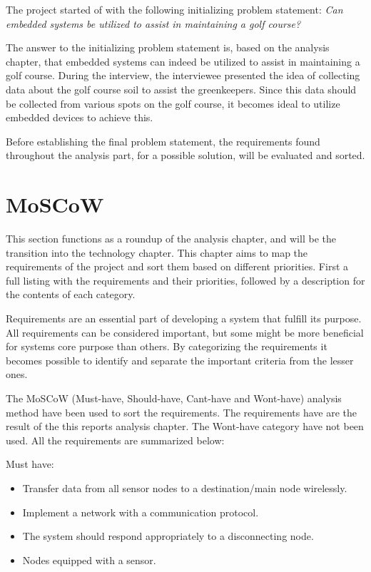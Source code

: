 The project started of with the following initializing problem statement:
\textit{Can embedded systems be utilized to assist in maintaining a golf course?}

The answer to the initializing problem statement is, based on the analysis chapter, that embedded systems can indeed be utilized to assist in maintaining a golf course. During the interview, the interviewee presented the idea of collecting data about the golf course soil to assist the greenkeepers. Since this data should be collected from various spots on the golf course, it becomes ideal to utilize embedded devices to achieve this.

Before establishing the final problem statement, the requirements found throughout the analysis part, for a possible solution, will be evaluated and sorted.

\section{MoSCoW}
This section functions as a roundup of the analysis chapter, and will be the transition into the technology chapter. This chapter aims to map the requirements of the project and sort them based on different priorities. First a full listing with the requirements and their priorities, followed by a description for the contents of each category.

Requirements are an essential part of developing a system that fulfill its purpose. All requirements can be considered important, but some might be more beneficial for systems core purpose than others. By categorizing the requirements it becomes possible to identify and separate the important criteria from the lesser ones. 

The MoSCoW (Must-have, Should-have, Cant-have and Wont-have) analysis method have been used to sort the requirements. The requirements have are the result of the this reports analysis chapter. The Wont-have category have not been used. All the requirements are summarized below:


Must have:
\begin{itemize}
\item Transfer data from all sensor nodes to a destination/main node wirelessly.
\item Implement a network with a communication protocol.
\item The system should respond appropriately to a disconnecting node.
\item Nodes equipped with a sensor.
\end{itemize}


